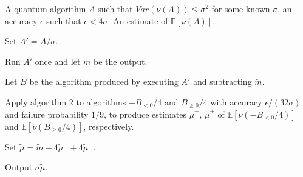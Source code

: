 \documentclass{article}
\begin{document}
\pagestyle{empty} 

\begin{algorithm}[ht]
	\caption{} 
	\begin{algorithmic}[1]

		\Require  A quantum algorithm $A$ such that $Var(\nu(A))\leq \sigma^2$ for some known $\sigma$, an accuracy $\epsilon$ such that $\epsilon<4\sigma$.
		\Ensure An estimate of $\mathbb{E}[\nu(A)]$.
		\vspace{10pt}
		\Statex 
		
		\State Set $A'=A/\sigma$.
		
		\State Run $A'$ once and let $\widetilde{m}$ be the output.
		
		 \State Let $B$ be the algorithm produced by executing $A'$ and subtracting $\widetilde{m}$.
		 
	 \State Apply algorithm 2 to algorithms $-B_{<0}/4$ and $B_{\geq 0}/4$ with accuracy $\epsilon/(32\sigma)$ and failure probability $1/9$, to produce estimates $\widetilde{\mu}^-$, $\widetilde{\mu}^+$ of $\mathbb{E}[\nu(-B_{<0}/4)]$ and $\mathbb{E}[\nu(B_{\geq 0}/4)]$, respectively.
	 
		\State Set $\widetilde{\mu}= \widetilde{m}-4\widetilde{\mu}^-+4\widetilde{\mu}^+$.
		
		\State Output $\sigma \widetilde{\mu}$.
		
	\end{algorithmic}
\end{algorithm}
\end{document}
